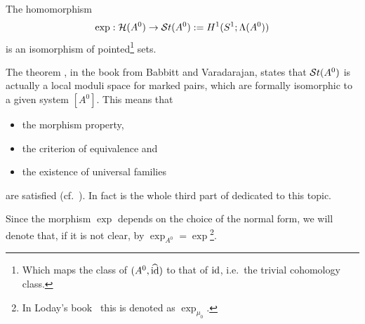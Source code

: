 \begin{tthm} \label{thm:mainThm1}
  The homomorphism
  \[
    \exp:\mathcal{H}(A^0)\to\mathcal{S}{}t(A^0):=H^1(S^1;\Lambda(A^0))
  \]
  is an isomorphism of pointed\footnote{Which maps the class of
  $(A^0,\widehat{\operatorname{id}})$ to that of $\operatorname{id}$, i.e.\ the trivial cohomology class.} sets.
\end{tthm}
\begin{rem}
  The theorem \cite[Thm.III.1.1.2]{babbitt1989local}, in the book from
  Babbitt and Varadarajan, states that $\mathcal{S}{}t(A^0)$ is actually a local moduli
  space for marked pairs, which are formally isomorphic to a given system
  $[A^0]$.
  This means that
  \begin{itemize}
    \item the morphism property,
    \item the criterion of equivalence and
    \item the existence of universal families
  \end{itemize}
  are satisfied (cf.\ \cite[169]{babbitt1989local}).
  In fact is the whole third part of \cite{babbitt1989local} dedicated to this
  topic.
\end{rem}
Since the morphism $\exp$ depends on the choice of the normal form, we will
denote that, if it is not clear, by
$\exp_{A^0}=\exp$\footnote{In Loday's book~\cite{Loday1994} this is denoted as
$\exp_{\mu_0}$.}.
